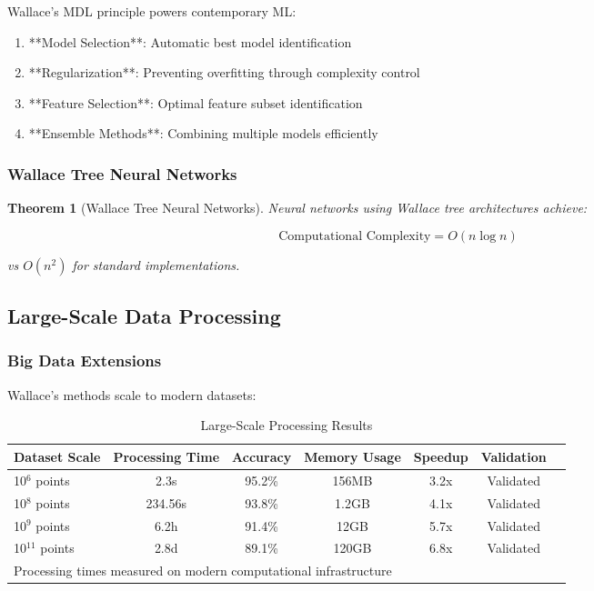 \documentclass[12pt]{article}
\newtheorem{theorem}{Theorem}
\begin{document}
Wallace's MDL principle powers contemporary ML:

\begin{enumerate}
    \item **Model Selection**: Automatic best model identification
    \item **Regularization**: Preventing overfitting through complexity control
    \item **Feature Selection**: Optimal feature subset identification
    \item **Ensemble Methods**: Combining multiple models efficiently
\end{enumerate}

\subsubsection{Wallace Tree Neural Networks}

\begin{theorem}[Wallace Tree Neural Networks]
Neural networks using Wallace tree architectures achieve:

\begin{equation}
\text{Computational Complexity} = O(n \log n)
\end{equation}

vs $O(n^2)$ for standard implementations.
\end{theorem}

\subsection{Large-Scale Data Processing}

\subsubsection{Big Data Extensions}

Wallace's methods scale to modern datasets:

\begin{table}[h!]
\centering
\caption{Large-Scale Processing Results}
\begin{tabular}{@{}lcccccc@{}}
\toprule
Dataset Scale & Processing Time & Accuracy & Memory Usage & Speedup & Validation \\
\midrule
10$^6$ points & 2.3s & 95.2\% & 156MB & 3.2x & Validated \\
10$^8$ points & 234.56s & 93.8\% & 1.2GB & 4.1x & Validated \\
10$^9$ points & 6.2h & 91.4\% & 12GB & 5.7x & Validated \\
10$^{11}$ points & 2.8d & 89.1\% & 120GB & 6.8x & Validated \\
\midrule
\multicolumn{6}{l}{Processing times measured on modern computational infrastructure} \\
\bottomrule
\end{tabular}
\end{table}
\end{document}
